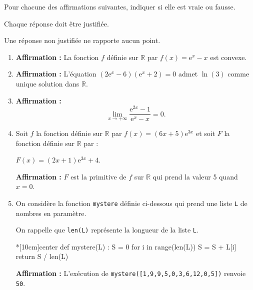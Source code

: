 Pour chacune des affirmations suivantes, indiquer si elle est vraie ou fausse. 

Chaque réponse doit être justifiée. 

Une réponse non justifiée ne rapporte aucun point.

\begin{enumerate}
	\item \textbf{Affirmation :} La fonction $f$ définie sur $\mathbb{R}$ par $f(x) = \text{e}^x - x$ est convexe.
	\item \textbf{Affirmation :} L'équation $\left(2\text{e}^x - 6\right)\left(\text{e}^x + 2\right) = 0$ admet $\ln (3)$ comme unique solution dans $\mathbb{R}$.
	\item \textbf{Affirmation :} \[\displaystyle\lim_{x \to + \infty} \dfrac{\text{e}^{2x} - 1}{\text{e}^x - x} = 0.\]
	\item Soit $f$ la fonction définie sur $\mathbb{R}$ par $f(x) = (6x + 5)\text{e}^{3x}$ et soit $F$ la fonction définie sur $\mathbb{R}$ par :
	
	$F(x) = (2x + 1)\text{e}^{3x} + 4$.
	
	\textbf{Affirmation :} $F$ est la primitive de $f$ sur $\mathbb{R}$ qui prend la valeur 5 quand $x = 0$.
	\item On considère la fonction \texttt{mystere} définie ci-dessous qui prend une liste \texttt{L} de nombres en paramètre.
	
	On rappelle que \texttt{len(L)} représente la longueur de la liste \texttt{L}.
	
\begin{CodePythonLst}*[10cm]{center}
def mystere(L) :
	S = 0
	for i in range(len(L))
		S = S + L[i]
	return S / len(L)
\end{CodePythonLst}

	\textbf{Affirmation :} L'exécution de \texttt{mystere([1,9,9,5,0,3,6,12,0,5])} renvoie \texttt{50}.
\end{enumerate}
